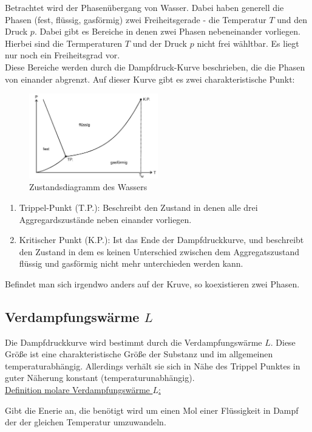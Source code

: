 Betrachtet wird der Phasenübergang von Wasser.
Dabei haben generell die Phasen (fest, flüssig, gasförmig) zwei Freiheitsgerade - die Temperatur $T$ und den Druck $p$.
Dabei gibt es Bereiche in denen zwei Phasen nebeneinander vorliegen. Hierbei sind die Termperaturen $T$ und der Druck $p$
nicht frei wähltbar. Es liegt nur noch ein Freiheitsgrad vor.\\
Diese Bereiche werden durch die Dampfdruck-Kurve beschrieben, die die Phasen von einander abgrenzt.
Auf dieser Kurve gibt es zwei charakteristische Punkt:
\begin{figure}
    \centering
    \includegraphics[width=0.5\textwidth]{bilder/zustandsdiagramm.jpg}
    \caption{Zustandsdiagramm des Wassers \cite[176]{Anleitung}}
    \label{fig:diagramm}
\end{figure}
\newpage
\begin{enumerate}
    \item Trippel-Punkt (T.P.): Beschreibt den Zustand in denen alle drei Aggregardszustände neben einander vorliegen.
    \item Kritischer Punkt (K.P.): Ist das Ende der Dampfdruckkurve, und beschreibt den Zustand in dem es keinen Unterschied
        zwischen dem Aggregatszustand flüssig und gasförmig nicht mehr unterchieden werden kann.
\end{enumerate}
Befindet man sich irgendwo anders auf der Kruve, so koexistieren zwei Phasen.
\subsection{Verdampfungswärme $L$}
Die Dampfdruckkurve wird bestimmt durch die Verdampfungswärme $L$.
Diese Größe ist eine charakteristische Größe der Substanz und im allgemeinen temperaturabhängig.
Allerdings verhält sie sich in Nähe des Trippel Punktes in guter Näherung konstant (temperaturunabhängig).\\\newline
\uline{Definition molare Verdampfungswärme $L$:}
\begin{flushleft}
Gibt die Enerie an, die benötigt wird um einen Mol einer Flüssigkeit in Dampf der
der gleichen Temperatur umzuwandeln.
\end{flushleft}

